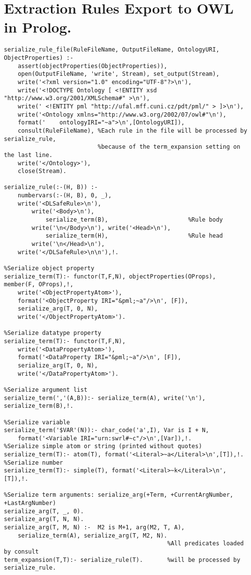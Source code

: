 \clearpage
\section{Extraction Rules Export to OWL in Prolog.} \label{sec:onto_prolog_rules_export_module}
\begin{verbatim}
serialize_rule_file(RuleFileName, OutputFileName, OntologyURI, ObjectProperties) :-
	assert(objectProperties(ObjectProperties)),
	open(OutputFileName, 'write', Stream), set_output(Stream),
	write('<?xml version="1.0" encoding="UTF-8"?>\n'),
	write('<!DOCTYPE Ontology [ <!ENTITY xsd "http://www.w3.org/2001/XMLSchema#" >\n'),
	write('	<!ENTITY pml "http://ufal.mff.cuni.cz/pdt/pml/" > ]>\n'),		
	write('<Ontology xmlns="http://www.w3.org/2002/07/owl#"\n'),	
	format('	ontologyIRI="~a">\n',[OntologyURI]),
	consult(RuleFileName), %Each rule in the file will be processed by serialize_rule,
	                       %because of the term_expansion setting on the last line. 	                         
	write('</Ontology>'),			
	close(Stream).

serialize_rule(:-(H, B)) :- 	
	numbervars(:-(H, B), 0, _),	
	write('<DLSafeRule>\n'),		
		write('<Body>\n'),          
			serialize_term(B),                       %Rule body
		write('\n</Body>\n'), write('<Head>\n'),
			serialize_term(H),                       %Rule head
		write('\n</Head>\n'),			
	write('</DLSafeRule>\n\n'),!.
	 
%Serialize object property
serialize_term(T):- functor(T,F,N), objectProperties(OProps), member(F, OProps),!,	
	write('<ObjectPropertyAtom>'),
	format('<ObjectProperty IRI="&pml;~a"/>\n', [F]),
	serialize_arg(T, 0, N),		
	write('</ObjectPropertyAtom>').

%Serialize datatype property
serialize_term(T):- functor(T,F,N),	
	write('<DataPropertyAtom>'),
	format('<DataProperty IRI="&pml;~a"/>\n', [F]),
	serialize_arg(T, 0, N),		
	write('</DataPropertyAtom>').

%Serialize argument list
serialize_term(','(A,B)):- serialize_term(A), write('\n'), serialize_term(B),!.

%Serialize variable
serialize_term('$VAR'(N)):- char_code('a',I), Var is I + N,
	format('<Variable IRI="urn:swrl#~c"/>\n',[Var]),!.
%Serialize simple atom or string (printed without quotes)
serialize_term(T):- atom(T), format('<Literal>~a</Literal>\n',[T]),!.
%Serialize number
serialize_term(T):- simple(T), format('<Literal>~k</Literal>\n',[T]),!.

%Serialize term arguments: serialize_arg(+Term, +CurrentArgNumber, +LastArgNumber)
serialize_arg(T, _, 0).
serialize_arg(T, N, N).
serialize_arg(T, M, N) :-  M2 is M+1, arg(M2, T, A),
	serialize_term(A), serialize_arg(T, M2, N).  
                                               %All predicates loaded by consult
term_expansion(T,T):- serialize_rule(T).       %will be processed by serialize_rule.
\end{verbatim}